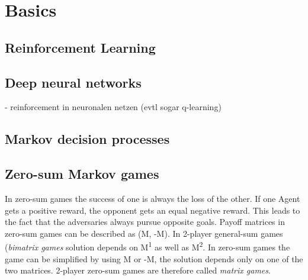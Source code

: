\begin{comment}
THOMY:

- Basics?
was rein?
	- reinforcement learning? - auf jeden fall
    - deep neural networks? - deep reinforcement learning (reinforcement mit neuronalen netzen) (q-learning)
    - value network vs policy network - nein
    - monte-carlo-search-trees - nein
    - PPO (proximal policy optimization) -nein
    - zero sum games (!) - definition - konsistente notation 
    
    - Formeln (markov decision processes)

\end{comment}

\section{Basics}
\label{Basics}

\subsection{Reinforcement Learning}

\subsection{Deep neural networks}
- reinforcement in neuronalen netzen (evtl sogar q-learning)

\subsection{Markov decision processes}
\label{mdp}



\subsection{Zero-sum Markov games}
\label{zerosumgames}

In zero-sum games the success of one is always the loss of the other. If one Agent gets a positive reward, the opponent gets an equal negative reward. This leads to the fact that the adversaries always pursue opposite goals. Payoff matrices in zero-sum games can be described as (M, -M). In 2-player general-sum games (\textit{bimatrix games} solution depends on M\textsuperscript{1} as well as M\textsuperscript{2}. In zero-sum games the game can be simplified by using M or -M, the solution depends only on one of the two matrices. 2-player zero-sum games are therefore called \textit{matrix games}\cite{basics2hu1998multiagent}.


